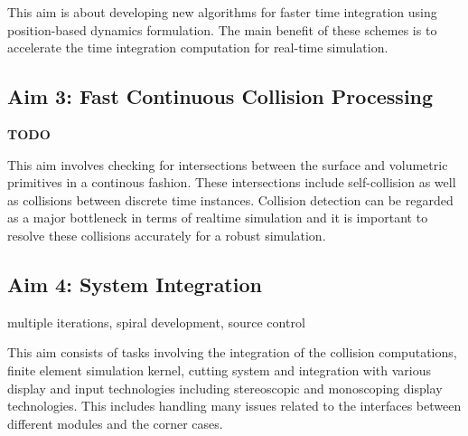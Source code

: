 This aim is about developing new algorithms for faster time integration using position-based dynamics formulation. The main benefit of these schemes is to accelerate the time integration computation for real-time simulation.

\subsection{Aim 3: Fast Continuous Collision Processing}

\textbf{TODO}

This aim involves checking for intersections between the surface and volumetric primitives in a continous fashion. These intersections include self-collision as well as collisions between discrete time instances. Collision detection can be regarded as a major bottleneck in terms of realtime simulation and it is important to resolve these collisions accurately for a robust simulation.

\subsection{Aim 4: System Integration}

multiple iterations, spiral development, source control

This aim consists of tasks involving the integration of the collision computations, finite element simulation kernel, cutting system and integration with various display and input technologies including stereoscopic and monoscoping display technologies. This includes handling many issues related to the interfaces between different modules and the corner cases.

